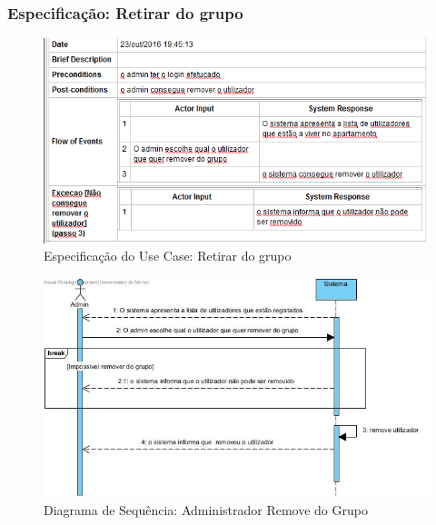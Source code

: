 \subsubsection{Especificação: Retirar do grupo }

\begin{figure}[htb!]
	\centering
	\includegraphics[scale=0.7]{imagens/Especificacoes/retirardogrupo}  
	\caption{Especificação do Use Case: Retirar do grupo}  
\end{figure}

\begin{figure}[htb!]
	\centering
	\includegraphics[scale=0.5]{imagens/DiagramaSeq/RetirarDoGrupo}  
	\caption{Diagrama de Sequência: Administrador Remove do Grupo}  
\end{figure}

